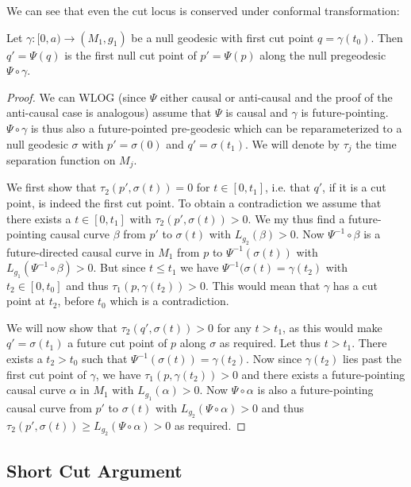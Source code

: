 We can see that even the cut locus is conserved under conformal transformation:
\begin{proposition}
Let $\gamma:[0,a)\to (M_1,g_1)$ be a null geodesic with first cut point $q=\gamma(t_0)$. Then $q'=\Psi(q)$ is the first null cut point of $p'=\Psi(p)$ along the null pregeodesic $\Psi\circ\gamma$.
\end{proposition}
\begin{proof}
We can WLOG (since $\Psi$ either causal or anti-causal and the proof of the anti-causal case is analogous) assume that $\Psi$ is causal and $\gamma$ is future-pointing. $\Psi\circ\gamma$ is thus also a future-pointed pre-geodesic which can be reparameterized to a null geodesic $\sigma$ with $p'=\sigma(0)$ and $q'=\sigma(t_1)$. We will denote by $\tau_j$ the time separation function on $M_j$.

We first show that $\tau_2(p',\sigma(t))=0$ for $t\in [0,t_1]$, i.e. that $q'$, if it is a cut point, is indeed the first cut point. To obtain a contradiction we assume that there exists a $t\in [0,t_1]$ with $\tau_2(p',\sigma(t))>0$. We my thus find a future-pointing causal curve $\beta$ from $p'$ to $\sigma(t)$ with $L_{g_2}(\beta)>0$. Now $\Psi^{-1}\circ \beta$ is a future-directed causal curve in $M_1$ from $p$ to $\Psi^{-1}(\sigma(t))$ with $L_{g_1}(\Psi^{-1}\circ\beta)>0$. But since $t\leq t_1$ we have $\Psi^{-1}(\sigma(t) = \gamma(t_2)$ with $t_2\in [0,t_0]$ and thus $\tau_1(p,\gamma(t_2))>0$. This would mean that $\gamma$ has a cut point at $t_2$, before $t_0$ which is a contradiction.

We will now show that $\tau_2(q',\sigma(t)) > 0$ for any $t>t_1$, as this would make $q'=\sigma(t_1)$ a future cut point of $p$ along $\sigma$ as required.
Let thus $t>t_1$. There exists a $t_2>t_0$ such that $\Psi^{-1}(\sigma(t))=\gamma(t_2)$. Now since $\gamma(t_2)$ lies past the first cut point of $\gamma$, we have $\tau_1(p,\gamma(t_2))>0$ and there exists a future-pointing causal curve $\alpha$ in $M_1$ with $L_{g_1}(\alpha)>0$. Now $\Psi\circ\alpha$ is also a future-pointing causal curve from $p'$ to $\sigma(t)$ with $L_{g_2}(\Psi\circ\alpha)>0$ and thus $\tau_2(p',\sigma(t)) \ge L_{g_2}(\Psi\circ\alpha)>0$ as required.
\end{proof}




\subsection{Short Cut Argument}

